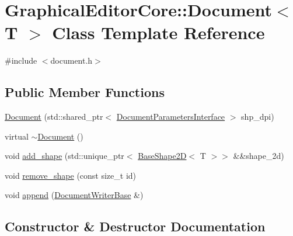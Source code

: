 \hypertarget{classGraphicalEditorCore_1_1Document}{}\section{Graphical\+Editor\+Core\+:\+:Document$<$ T $>$ Class Template Reference}
\label{classGraphicalEditorCore_1_1Document}


{\ttfamily \#include $<$document.\+h$>$}

\subsection*{Public Member Functions}
\begin{DoxyCompactItemize}
\item 
\hyperlink{classGraphicalEditorCore_1_1Document_a60780d888bf00a262dc1df546b3660ea}{Document} (std\+::shared\+\_\+ptr$<$ \hyperlink{classGraphicalEditorCore_1_1DocumentParametersInterface}{Document\+Parameters\+Interface} $>$ shp\+\_\+dpi)
\item 
virtual \hyperlink{classGraphicalEditorCore_1_1Document_a4cadcf8e4a1e1873b372db9740db06f0}{$\sim$\+Document} ()
\item 
void \hyperlink{classGraphicalEditorCore_1_1Document_abe527194c1568fd30d2aaaa3892d024a}{add\+\_\+shape} (std\+::unique\+\_\+ptr$<$ \hyperlink{classGraphicalEditorCore_1_1BaseShape2D}{Base\+Shape2D}$<$ T $>$$>$ \&\&shape\+\_\+2d)
\item 
void \hyperlink{classGraphicalEditorCore_1_1Document_aac9bdac723068023fa0f46f021114566}{remove\+\_\+shape} (const size\+\_\+t id)
\item 
void \hyperlink{classGraphicalEditorCore_1_1Document_a7948bd4c1ddae61d1c3208e04c20f5ff}{append} (\hyperlink{classGraphicalEditorCore_1_1DocumentWriterBase}{Document\+Writer\+Base} \&)
\end{DoxyCompactItemize}


\subsection{Constructor \& Destructor Documentation}
